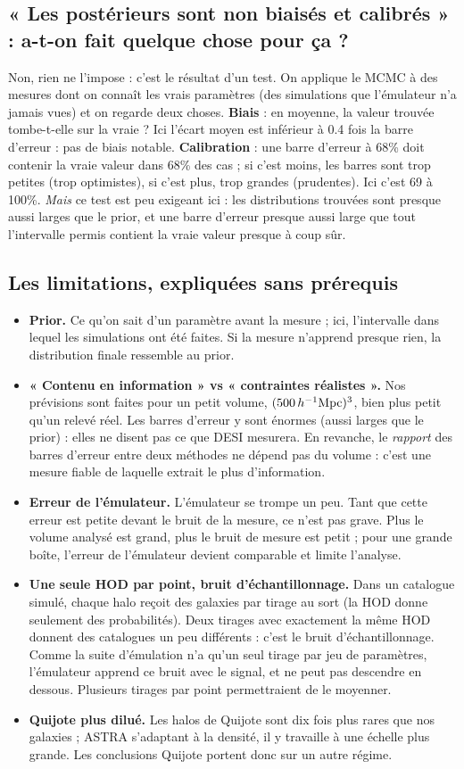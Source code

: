 \subsection{« Les postérieurs sont non biaisés et calibrés » : a-t-on fait quelque chose pour ça ?}
Non, rien ne l'impose : c'est le résultat d'un test. On applique le MCMC à des mesures dont on connaît les vrais paramètres (des simulations que l'émulateur n'a jamais vues) et on regarde deux choses. \textbf{Biais} : en moyenne, la valeur trouvée tombe-t-elle sur la vraie ? Ici l'écart moyen est inférieur à 0.4 fois la barre d'erreur : pas de biais notable. \textbf{Calibration} : une barre d'erreur à 68\% doit contenir la vraie valeur dans 68\% des cas ; si c'est moins, les barres sont trop petites (trop optimistes), si c'est plus, trop grandes (prudentes). Ici c'est 69 à 100\%. \emph{Mais} ce test est peu exigeant ici : les distributions trouvées sont presque aussi larges que le prior, et une barre d'erreur presque aussi large que tout l'intervalle permis contient la vraie valeur presque à coup sûr.

\subsection{Les limitations, expliquées sans prérequis}
\begin{itemize}
\item \textbf{Prior.} Ce qu'on sait d'un paramètre avant la mesure ; ici, l'intervalle dans lequel les simulations ont été faites. Si la mesure n'apprend presque rien, la distribution finale ressemble au prior.
\item \textbf{« Contenu en information » vs « contraintes réalistes ».} Nos prévisions sont faites pour un petit volume, $(500\,h^{-1}\mathrm{Mpc})^3$, bien plus petit qu'un relevé réel. Les barres d'erreur y sont énormes (aussi larges que le prior) : elles ne disent pas ce que DESI mesurera. En revanche, le \emph{rapport} des barres d'erreur entre deux méthodes ne dépend pas du volume : c'est une mesure fiable de laquelle extrait le plus d'information.
\item \textbf{Erreur de l'émulateur.} L'émulateur se trompe un peu. Tant que cette erreur est petite devant le bruit de la mesure, ce n'est pas grave. Plus le volume analysé est grand, plus le bruit de mesure est petit ; pour une grande boîte, l'erreur de l'émulateur devient comparable et limite l'analyse.
\item \textbf{Une seule HOD par point, bruit d'échantillonnage.} Dans un catalogue simulé, chaque halo reçoit des galaxies par tirage au sort (la HOD donne seulement des probabilités). Deux tirages avec exactement la même HOD donnent des catalogues un peu différents : c'est le bruit d'échantillonnage. Comme la suite d'émulation n'a qu'un seul tirage par jeu de paramètres, l'émulateur apprend ce bruit avec le signal, et ne peut pas descendre en dessous. Plusieurs tirages par point permettraient de le moyenner.
\item \textbf{Quijote plus dilué.} Les halos de Quijote sont dix fois plus rares que nos galaxies ; ASTRA s'adaptant à la densité, il y travaille à une échelle plus grande. Les conclusions Quijote portent donc sur un autre régime.
\end{itemize}

